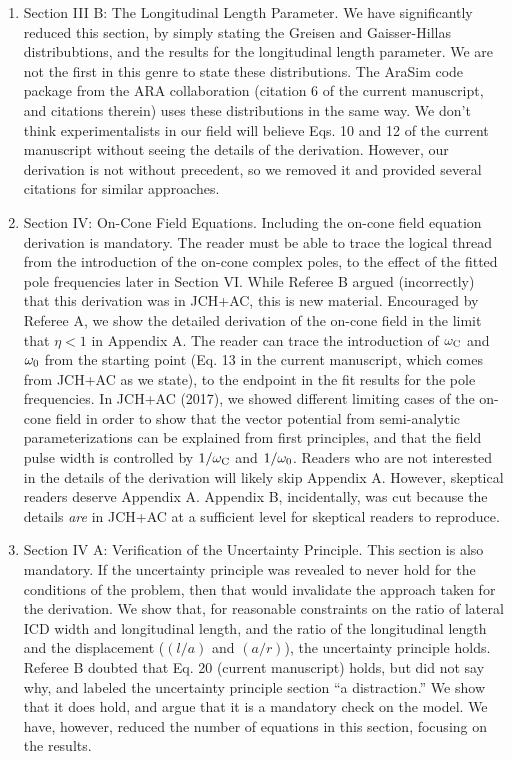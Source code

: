 \documentclass[12pt]{article}
\begin{document}
\begin{enumerate}
\item Section III B: The Longitudinal Length Parameter.  We have significantly reduced this section, by simply stating the Greisen and Gaisser-Hillas distribubtions, and the results for the longitudinal length parameter.  We are not the first in this genre to state these distributions.  The AraSim code package from the ARA collaboration (citation 6 of the current manuscript, and citations therein) uses these distributions in the same way.  We don't think experimentalists in our field will believe Eqs. 10 and 12 of the current manuscript without seeing the details of the derivation.  However, our derivation is not without precedent, so we removed it and provided several citations for similar approaches.
\item Section IV: On-Cone Field Equations.  Including the on-cone field equation derivation is mandatory.  The reader must be able to trace the logical thread from the introduction of the on-cone complex poles, to the effect of the fitted pole frequencies later in Section VI.  While Referee B argued (incorrectly) that this derivation was in JCH+AC, this is new material.  Encouraged by Referee A, we show the detailed derivation of the on-cone field in the limit that $\eta < 1$ in Appendix A.  The reader can trace the introduction of $\omega_{\rm C}$ and $\omega_{\rm 0}$ from the starting point (Eq. 13 in the current manuscript, which comes from JCH+AC as we state), to the endpoint in the fit results for the pole frequencies.  In JCH+AC (2017), we showed different limiting cases of the on-cone field in order to show that the vector potential from semi-analytic parameterizations can be explained from first principles, and that the field pulse width is controlled by $1/\omega_{\rm C}$ and $1/\omega_{\rm 0}$.  Readers who are not interested in the details of the derivation will likely skip Appendix A.  However, skeptical readers deserve Appendix A.  Appendix B, incidentally, was cut because the details \textit{are} in JCH+AC at a sufficient level for skeptical readers to reproduce.
\item Section IV A: Verification of the Uncertainty Principle.  This section is also mandatory.  If the uncertainty principle was revealed to never hold for the conditions of the problem, then that would invalidate the approach taken for the derivation.  We show that, for reasonable constraints on the ratio of lateral ICD width and longitudinal length, and the ratio of the longitudinal length and the displacement ($(l/a)$ and $(a/r)$), the uncertainty principle holds.  Referee B doubted that Eq. 20 (current manuscript) holds, but did not say why, and labeled the uncertainty principle section ``a distraction.''  We show that it does hold, and argue that it is a mandatory check on the model.  We have, however, reduced the number of equations in this section, focusing on the results.

\end{enumerate}
\end{document}
